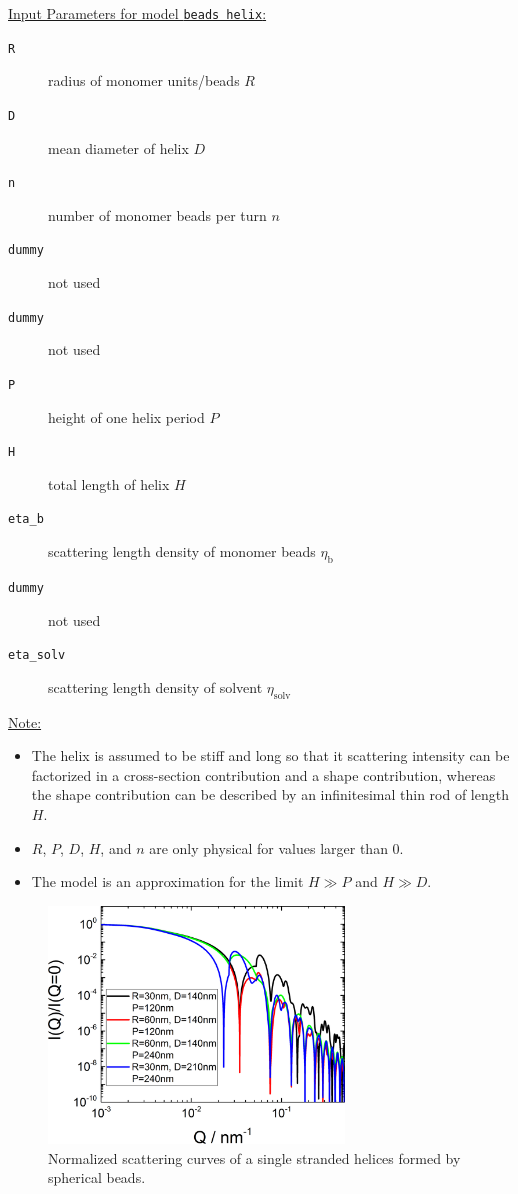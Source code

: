 \underline{Input Parameters for model \texttt{beads helix}:}\\
\begin{description}
\item[\texttt{R}] radius of monomer units/beads $R$
\item[\texttt{D}] mean diameter of helix $D$
\item[\texttt{n}] number of monomer beads per turn $n$
\item[\texttt{dummy}] not used
\item[\texttt{dummy}] not used
\item[\texttt{P}] height of one helix period $P$
\item[\texttt{H}] total length of helix $H$
\item[\texttt{eta\_b}] scattering length density of monomer beads $\eta_\text{b}$
\item[\texttt{dummy}] not used
\item[\texttt{eta\_solv}] scattering length density of solvent $\eta_\text{solv}$
\end{description}

\noindent\underline{Note:}
\begin{itemize}
\item The helix is assumed to be stiff and long so that it scattering intensity can be factorized in a cross-section contribution and a shape contribution, whereas the shape contribution can be described by an infinitesimal thin rod of length $H$.
\item $R$, $P$, $D$, $H$, and $n$ are only physical for values larger than 0.
\item The model is an approximation for the limit $H \gg P$ and $H \gg D$.
\end{itemize}

\begin{figure}[htb]
\begin{center}
\includegraphics[width=0.7\textwidth]{../images/form_factor/cylindrical_obj/helix_beadsIQ.png}
\end{center}
\caption{Normalized scattering curves of a single stranded helices formed by spherical beads.}
\label{fig:helixbeadsIQ}
\end{figure}


